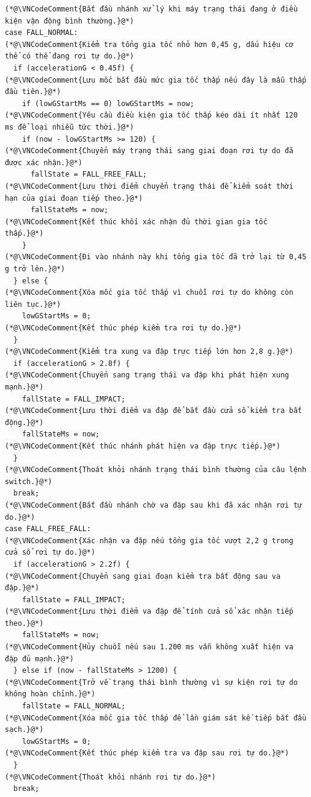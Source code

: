 \documentclass[12pt]{article}
\begin{document}
\Needspace{0.42\textheight}
\thispagestyle{fancy}
\begin{lstlisting}[style=firmware,caption={Các điều kiện quyết định trong máy trạng thái té ngã}]
(*@\VNCodeComment{Bắt đầu nhánh xử lý khi máy trạng thái đang ở điều kiện vận động bình thường.}@*)
case FALL_NORMAL:
(*@\VNCodeComment{Kiểm tra tổng gia tốc nhỏ hơn 0,45 g, dấu hiệu cơ thể có thể đang rơi tự do.}@*)
  if (accelerationG < 0.45f) {
(*@\VNCodeComment{Lưu mốc bắt đầu mức gia tốc thấp nếu đây là mẫu thấp đầu tiên.}@*)
    if (lowGStartMs == 0) lowGStartMs = now;
(*@\VNCodeComment{Yêu cầu điều kiện gia tốc thấp kéo dài ít nhất 120 ms để loại nhiễu tức thời.}@*)
    if (now - lowGStartMs >= 120) {
(*@\VNCodeComment{Chuyển máy trạng thái sang giai đoạn rơi tự do đã được xác nhận.}@*)
      fallState = FALL_FREE_FALL;
(*@\VNCodeComment{Lưu thời điểm chuyển trạng thái để kiểm soát thời hạn của giai đoạn tiếp theo.}@*)
      fallStateMs = now;
(*@\VNCodeComment{Kết thúc khối xác nhận đủ thời gian gia tốc thấp.}@*)
    }
(*@\VNCodeComment{Đi vào nhánh này khi tổng gia tốc đã trở lại từ 0,45 g trở lên.}@*)
  } else {
(*@\VNCodeComment{Xóa mốc gia tốc thấp vì chuỗi rơi tự do không còn liên tục.}@*)
    lowGStartMs = 0;
(*@\VNCodeComment{Kết thúc phép kiểm tra rơi tự do.}@*)
  }
(*@\VNCodeComment{Kiểm tra xung va đập trực tiếp lớn hơn 2,8 g.}@*)
  if (accelerationG > 2.8f) {
(*@\VNCodeComment{Chuyển sang trạng thái va đập khi phát hiện xung mạnh.}@*)
    fallState = FALL_IMPACT;
(*@\VNCodeComment{Lưu thời điểm va đập để bắt đầu cửa sổ kiểm tra bất động.}@*)
    fallStateMs = now;
(*@\VNCodeComment{Kết thúc nhánh phát hiện va đập trực tiếp.}@*)
  }
(*@\VNCodeComment{Thoát khỏi nhánh trạng thái bình thường của câu lệnh switch.}@*)
  break;
(*@\VNCodeComment{Bắt đầu nhánh chờ va đập sau khi đã xác nhận rơi tự do.}@*)
case FALL_FREE_FALL:
(*@\VNCodeComment{Xác nhận va đập nếu tổng gia tốc vượt 2,2 g trong cửa sổ rơi tự do.}@*)
  if (accelerationG > 2.2f) {
(*@\VNCodeComment{Chuyển sang giai đoạn kiểm tra bất động sau va đập.}@*)
    fallState = FALL_IMPACT;
(*@\VNCodeComment{Lưu thời điểm va đập để tính cửa sổ xác nhận tiếp theo.}@*)
    fallStateMs = now;
(*@\VNCodeComment{Hủy chuỗi nếu sau 1.200 ms vẫn không xuất hiện va đập đủ mạnh.}@*)
  } else if (now - fallStateMs > 1200) {
(*@\VNCodeComment{Trở về trạng thái bình thường vì sự kiện rơi tự do không hoàn chỉnh.}@*)
    fallState = FALL_NORMAL;
(*@\VNCodeComment{Xóa mốc gia tốc thấp để lần giám sát kế tiếp bắt đầu sạch.}@*)
    lowGStartMs = 0;
(*@\VNCodeComment{Kết thúc phép kiểm tra va đập sau rơi tự do.}@*)
  }
(*@\VNCodeComment{Thoát khỏi nhánh rơi tự do.}@*)
  break;


\end{lstlisting}
\end{document}
